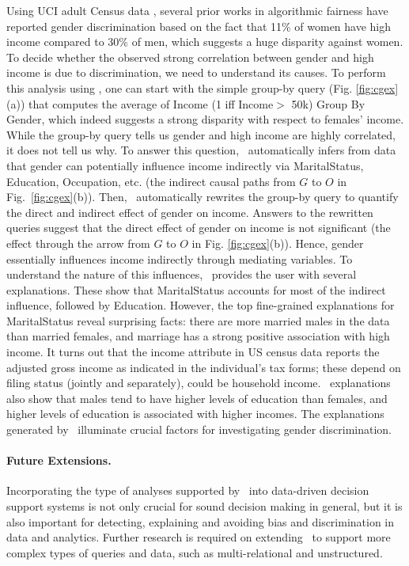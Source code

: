 \documentclass[11pt]{article}
\begin{document}
\begin{example} \label{ex:adult}  Using UCI adult Census data \cite{adult}, several prior works in algorithmic fairness have reported gender discrimination based on the fact that 11\% of women have
	high income compared to 30\% of men, which suggests a huge disparity against women.  To decide whether the observed strong correlation between gender and high income is due to discrimination, we need to understand its causes.
	To perform this analysis using \hsys, one can start with the simple group-by query (Fig. \ref{fig:cgex}(a)) that computes the average of Income (1 iff Income$>$ 50k) Group By Gender, which indeed suggests a strong
disparity with respect to females' income. While the group-by query tells us gender and high income are highly correlated, it does not tell us why. To answer this question, \hsys\ automatically infers from data that gender can potentially influence income indirectly via  MaritalStatus,  Education, Occupation, etc. (the indirect causal paths from $G$ to $O$ in Fig.~\ref{fig:cgex}(b)). Then, \hsys\ automatically
rewrites the group-by query to quantify the direct and indirect effect of gender on income. Answers to the rewritten queries suggest that the direct effect of gender on income is not significant (the effect through the arrow from $G$ to $O$ in Fig. \ref{fig:cgex}(b)). Hence, gender essentially influences income indirectly through mediating variables. To understand the nature of this influences, \hsys\ provides the user with several explanations. These show that MaritalStatus accounts for most of the indirect influence, followed by Education.  However, the top fine-grained explanations for MaritalStatus reveal  surprising facts: there are more married males in the data than married females, and marriage has a strong positive association with high income. It turns out that the income attribute in US census data reports the adjusted gross income as indicated in the individual's tax forms; 
these depend on  filing status (jointly and separately), could be  household income. \hsys\  explanations also show that males tend  to have higher levels of education than females, and higher levels of education is associated with higher incomes. The explanations generated by \hsys\ illuminate crucial factors for investigating gender discrimination.
\end{example}
\vspace{-0.5cm}
\paragraph{Future Extensions.} Incorporating the type of analyses supported by \hsys\ into data-driven decision support systems is not only crucial for sound decision making in general, but it is also important for detecting, explaining and avoiding bias and discrimination in data and analytics. Further research is required on extending \hsys\ to support more complex types of queries and data, such as multi-relational and unstructured.
\vspace{-0.3cm}
\end{document}
